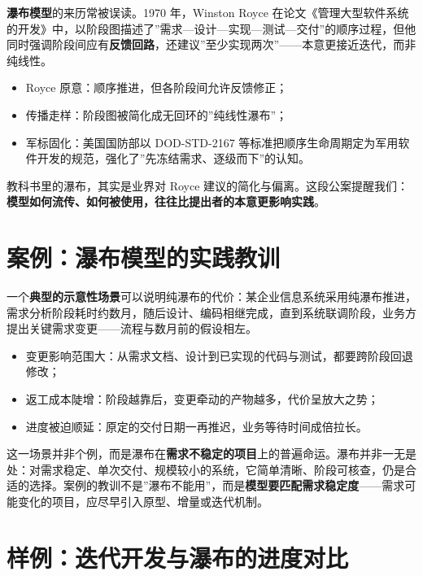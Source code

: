\documentclass[
]{ctexbook}
\providecommand{\tightlist}{\setlength{\itemsep}{0pt}\setlength{\parskip}{0pt} }
\begin{document}
\textbf{瀑布模型}的来历常被误读。1970 年，Winston Royce
在论文《管理大型软件系统的开发》中，以阶段图描述了''需求---设计---实现---测试---交付''的顺序过程，但他同时强调阶段间应有\textbf{反馈回路}，还建议''至少实现两次''------本意更接近迭代，而非纯线性。

\begin{itemize}
\tightlist
\item
  Royce 原意：顺序推进，但各阶段间允许反馈修正；
\item
  传播走样：阶段图被简化成无回环的''纯线性瀑布''；
\item
  军标固化：美国国防部以 DOD-STD-2167
  等标准把顺序生命周期定为军用软件开发的规范，强化了''先冻结需求、逐级而下''的认知。
\end{itemize}

教科书里的瀑布，其实是业界对 Royce
建议的简化与偏离。这段公案提醒我们：\textbf{模型如何流传、如何被使用，往往比提出者的本意更影响实践}。

\section{案例：瀑布模型的实践教训}\label{ux6848ux4f8bux7011ux5e03ux6a21ux578bux7684ux5b9eux8df5ux6559ux8bad}

一个\textbf{典型的示意性场景}可以说明纯瀑布的代价：某企业信息系统采用纯瀑布推进，需求分析阶段耗时约数月，随后设计、编码相继完成，直到系统联调阶段，业务方提出关键需求变更------流程与数月前的假设相左。

\begin{itemize}
\tightlist
\item
  变更影响范围大：从需求文档、设计到已实现的代码与测试，都要跨阶段回退修改；
\item
  返工成本陡增：阶段越靠后，变更牵动的产物越多，代价呈放大之势；
\item
  进度被迫顺延：原定的交付日期一再推迟，业务等待时间成倍拉长。
\end{itemize}

这一场景并非个例，而是瀑布在\textbf{需求不稳定的项目}上的普遍命运。瀑布并非一无是处：对需求稳定、单次交付、规模较小的系统，它简单清晰、阶段可核查，仍是合适的选择。案例的教训不是''瀑布不能用''，而是\textbf{模型要匹配需求稳定度}------需求可能变化的项目，应尽早引入原型、增量或迭代机制。

\section{样例：迭代开发与瀑布的进度对比}\label{ux6837ux4f8bux8fedux4ee3ux5f00ux53d1ux4e0eux7011ux5e03ux7684ux8fdbux5ea6ux5bf9ux6bd4}
\end{document}
